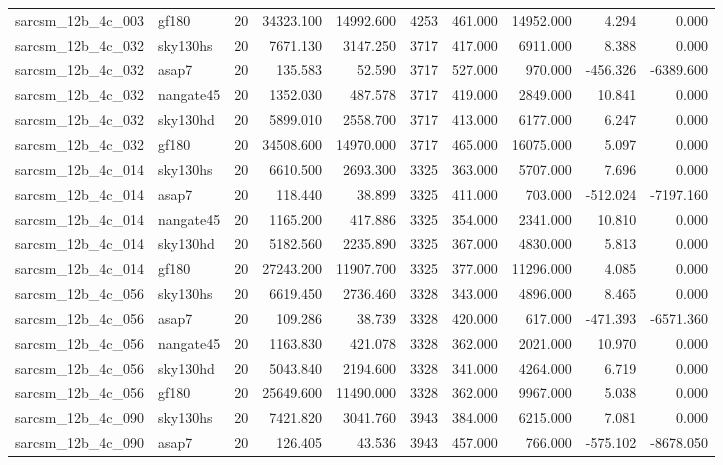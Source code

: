 \begin{longtable}{llrrrrrrrr}
sarcsm\_12b\_4c\_003 & gf180 & 20 & 34323.100 & 14992.600 & 4253 & 461.000 & 14952.000 & 4.294 & 0.000 \\
sarcsm\_12b\_4c\_032 & sky130hs & 20 & 7671.130 & 3147.250 & 3717 & 417.000 & 6911.000 & 8.388 & 0.000 \\
sarcsm\_12b\_4c\_032 & asap7 & 20 & 135.583 & 52.590 & 3717 & 527.000 & 970.000 & -456.326 & -6389.600 \\
sarcsm\_12b\_4c\_032 & nangate45 & 20 & 1352.030 & 487.578 & 3717 & 419.000 & 2849.000 & 10.841 & 0.000 \\
sarcsm\_12b\_4c\_032 & sky130hd & 20 & 5899.010 & 2558.700 & 3717 & 413.000 & 6177.000 & 6.247 & 0.000 \\
sarcsm\_12b\_4c\_032 & gf180 & 20 & 34508.600 & 14970.000 & 3717 & 465.000 & 16075.000 & 5.097 & 0.000 \\
sarcsm\_12b\_4c\_014 & sky130hs & 20 & 6610.500 & 2693.300 & 3325 & 363.000 & 5707.000 & 7.696 & 0.000 \\
sarcsm\_12b\_4c\_014 & asap7 & 20 & 118.440 & 38.899 & 3325 & 411.000 & 703.000 & -512.024 & -7197.160 \\
sarcsm\_12b\_4c\_014 & nangate45 & 20 & 1165.200 & 417.886 & 3325 & 354.000 & 2341.000 & 10.810 & 0.000 \\
sarcsm\_12b\_4c\_014 & sky130hd & 20 & 5182.560 & 2235.890 & 3325 & 367.000 & 4830.000 & 5.813 & 0.000 \\
sarcsm\_12b\_4c\_014 & gf180 & 20 & 27243.200 & 11907.700 & 3325 & 377.000 & 11296.000 & 4.085 & 0.000 \\
sarcsm\_12b\_4c\_056 & sky130hs & 20 & 6619.450 & 2736.460 & 3328 & 343.000 & 4896.000 & 8.465 & 0.000 \\
sarcsm\_12b\_4c\_056 & asap7 & 20 & 109.286 & 38.739 & 3328 & 420.000 & 617.000 & -471.393 & -6571.360 \\
sarcsm\_12b\_4c\_056 & nangate45 & 20 & 1163.830 & 421.078 & 3328 & 362.000 & 2021.000 & 10.970 & 0.000 \\
sarcsm\_12b\_4c\_056 & sky130hd & 20 & 5043.840 & 2194.600 & 3328 & 341.000 & 4264.000 & 6.719 & 0.000 \\
sarcsm\_12b\_4c\_056 & gf180 & 20 & 25649.600 & 11490.000 & 3328 & 362.000 & 9967.000 & 5.038 & 0.000 \\
sarcsm\_12b\_4c\_090 & sky130hs & 20 & 7421.820 & 3041.760 & 3943 & 384.000 & 6215.000 & 7.081 & 0.000 \\
sarcsm\_12b\_4c\_090 & asap7 & 20 & 126.405 & 43.536 & 3943 & 457.000 & 766.000 & -575.102 & -8678.050 \\

\end{longtable}
